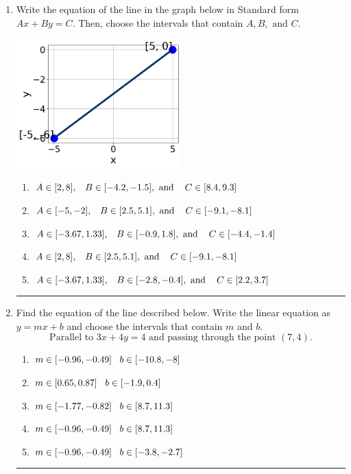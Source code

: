 \documentclass[14pt]{extbook}
\newcommand{\litem}[1]{\item#1\hspace*{-1cm}\rule{\textwidth}{0.4pt}}
\begin{document}
\begin{enumerate}
\litem{
Write the equation of the line in the graph below in Standard form $Ax+By=C$. Then, choose the intervals that contain $A, B, \text{ and } C$.
\begin{center}
    \includegraphics[width=0.5\textwidth]{../Figures/linearGraphToStandardC.png}
\end{center}
\begin{enumerate}[label=\Alph*.]
\item \( A \in [2, 8], \hspace{3mm} B \in [-4.2, -1.5], \text{ and } \hspace{3mm} C \in [8.4, 9.3] \)
\item \( A \in [-5, -2], \hspace{3mm} B \in [2.5, 5.1], \text{ and } \hspace{3mm} C \in [-9.1, -8.1] \)
\item \( A \in [-3.67, 1.33], \hspace{3mm} B \in [-0.9, 1.8], \text{ and } \hspace{3mm} C \in [-4.4, -1.4] \)
\item \( A \in [2, 8], \hspace{3mm} B \in [2.5, 5.1], \text{ and } \hspace{3mm} C \in [-9.1, -8.1] \)
\item \( A \in [-3.67, 1.33], \hspace{3mm} B \in [-2.8, -0.4], \text{ and } \hspace{3mm} C \in [2.2, 3.7] \)

\end{enumerate} }
\litem{
Find the equation of the line described below. Write the linear equation as $ y=mx+b $ and choose the intervals that contain $m$ and $b$.\[ \text{Parallel to } 3 x + 4 y = 4 \text{ and passing through the point } (7, 4). \]\begin{enumerate}[label=\Alph*.]
\item \( m \in [-0.96, -0.49] \hspace*{3mm} b \in [-10.8, -8] \)
\item \( m \in [0.65, 0.87] \hspace*{3mm} b \in [-1.9, 0.4] \)
\item \( m \in [-1.77, -0.82] \hspace*{3mm} b \in [8.7, 11.3] \)
\item \( m \in [-0.96, -0.49] \hspace*{3mm} b \in [8.7, 11.3] \)
\item \( m \in [-0.96, -0.49] \hspace*{3mm} b \in [-3.8, -2.7] \)


\end{enumerate}}
\end{enumerate}
\end{document}
